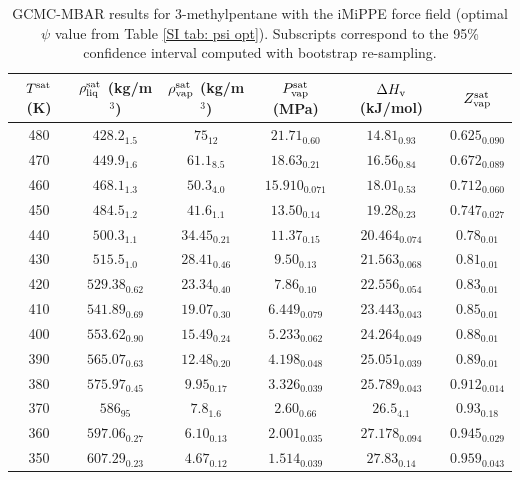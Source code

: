 \documentclass[journal=jctc,manuscript=article]{achemso}
\begin{document}
\begin{table}[htb!]
	\caption{GCMC-MBAR results for 3-methylpentane with the iMiPPE force field (optimal $\psi$ value from Table \ref{SI tab: psi opt}). Subscripts correspond to the 95\% confidence interval computed with bootstrap re-sampling.}
	\begin{center}
		\begin{tabular}{|c|c|c|c|c|c|}
			\hline
			$T^{\rm sat}$ (K) & $\rho_{\rm liq}^{\rm sat}$ (kg/m$^3$) & $\rho_{\rm vap}^{\rm sat}$ (kg/m$^3$) & $P_{\rm vap}^{\rm sat}$ (MPa) & $\Delta H_{\rm v}$ (kJ/mol) & $Z_{\rm vap}^{\rm sat}$ \\ \hline
			480 & $428.2_{1.5}$ & $75_{12}$ & $21.71_{0.60}$ & $14.81_{0.93}$ & $0.625_{0.090}$ \\
			470 & $449.9_{1.6}$ & $61.1_{8.5}$ & $18.63_{0.21}$ & $16.56_{0.84}$ & $0.672_{0.089}$ \\
			460 & $468.1_{1.3}$ & $50.3_{4.0}$ & $15.910_{0.071}$ & $18.01_{0.53}$ & $0.712_{0.060}$ \\
			450 & $484.5_{1.2}$ & $41.6_{1.1}$ & $13.50_{0.14}$ & $19.28_{0.23}$ & $0.747_{0.027}$ \\
			440 & $500.3_{1.1}$ & $34.45_{0.21}$ & $11.37_{0.15}$ & $20.464_{0.074}$ & $0.78_{0.01}$ \\
			430 & $515.5_{1.0}$ & $28.41_{0.46}$ & $9.50_{0.13}$ & $21.563_{0.068}$ & $0.81_{0.01}$ \\
			420 & $529.38_{0.62}$ & $23.34_{0.40}$ & $7.86_{0.10}$ & $22.556_{0.054}$ & $0.83_{0.01}$ \\
			410 & $541.89_{0.69}$ & $19.07_{0.30}$ & $6.449_{0.079}$ & $23.443_{0.043}$ & $0.85_{0.01}$ \\
			400 & $553.62_{0.90}$ & $15.49_{0.24}$ & $5.233_{0.062}$ & $24.264_{0.049}$ & $0.88_{0.01}$ \\
			390 & $565.07_{0.63}$ & $12.48_{0.20}$ & $4.198_{0.048}$ & $25.051_{0.039}$ & $0.89_{0.01}$ \\
			380 & $575.97_{0.45}$ & $9.95_{0.17}$ & $3.326_{0.039}$ & $25.789_{0.043}$ & $0.912_{0.014}$ \\
			370 & $586_{95}$ & $7.8_{1.6}$ & $2.60_{0.66}$ & $26.5_{4.1}$ & $0.93_{0.18}$ \\
			360 & $597.06_{0.27}$ & $6.10_{0.13}$ & $2.001_{0.035}$ & $27.178_{0.094}$ & $0.945_{0.029}$ \\
			350 & $607.29_{0.23}$ & $4.67_{0.12}$ & $1.514_{0.039}$ & $27.83_{0.14}$ & $0.959_{0.043}$ \\
			\hline
		\end{tabular}
	\end{center}
\end{table}
\end{document}
